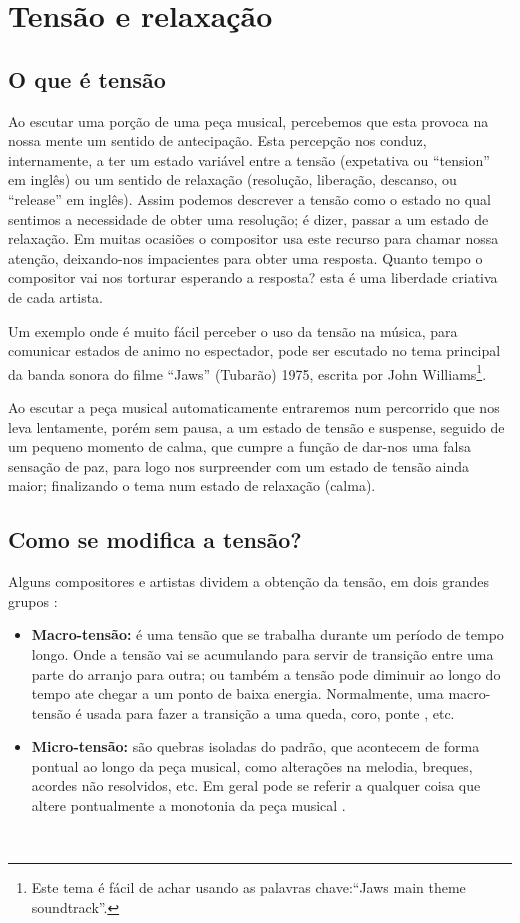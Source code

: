 \section{Tensão e relaxação }
\label{sec:tensionrelease}

\subsection{O que é tensão}
Ao escutar uma porção de uma peça musical, percebemos que esta provoca na nossa mente
um sentido de antecipação.
Esta percepção nos conduz, internamente, 
a ter um estado variável entre a tensão (expetativa ou ``tension'' em inglês)
ou um sentido de relaxação (resolução, liberação, descanso, ou ``release'' em inglês).
Assim podemos descrever a tensão como o 
estado no qual sentimos a necessidade de obter uma resolução; é dizer, passar a um estado de relaxação.
Em muitas ocasiões o compositor usa este recurso para chamar nossa atenção,
deixando-nos impacientes para obter uma resposta. 
Quanto tempo o compositor vai nos torturar esperando a resposta? 
esta é uma liberdade criativa de cada artista.

\begin{example}
Um exemplo onde é muito fácil perceber o uso da tensão na música, 
para comunicar estados de animo no espectador, 
pode ser escutado no tema principal da banda sonora do filme ``Jaws'' (Tubarão) 1975,
escrita por John Williams\footnote{Este tema é fácil de achar usando as palavras chave:``Jaws main theme soundtrack''.}.

Ao escutar a peça musical automaticamente entraremos num percorrido que nos leva lentamente,
porém sem pausa, a um estado de tensão e suspense, seguido de um pequeno momento de calma,
que cumpre a função de dar-nos uma falsa sensação de paz,
 para logo nos surpreender com um estado de tensão ainda maior;
finalizando o tema num estado de relaxação (calma).
\end{example}

\subsection{Como se modifica a tensão?}

Alguns compositores e artistas dividem a obtenção da tensão, em dois grandes grupos \cite{edmtensionrelease1}:
\begin{itemize}
\item \textbf{Macro-tensão:}
é uma tensão que se trabalha durante um período de tempo longo. 
Onde a tensão vai se acumulando para servir de transição entre uma parte do arranjo para outra;
ou também a tensão pode diminuir ao longo do tempo ate chegar a um ponto de baixa energia.
Normalmente, uma macro-tensão é usada para fazer a transição a uma queda, coro, ponte \cite{edmtensionrelease1}, etc.
\item \textbf{Micro-tensão:}
são  quebras isoladas do padrão, que acontecem de forma pontual ao longo da peça musical, 
como alterações na melodia, breques, acordes não resolvidos, etc. 
Em geral pode se referir a qualquer coisa que altere pontualmente a monotonia da peça musical \cite{edmtensionrelease1}.
\end{itemize}~

